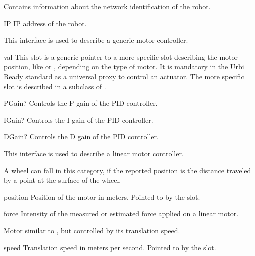 
Contains information about the network identification of the robot.

\begin{urbiscriptapi}
\item[IP] IP address of the robot.
\end{urbiscriptapi}


This interface is used to describe a generic motor controller.

\begin{urbiscriptapi}
\item[val] This slot is a generic pointer to a more specific slot describing
  the motor position, like  or , depending on the
  type of motor. It is mandatory in the Urbi Ready standard as a universal
  proxy to control an actuator. The more specific slot is described in a
  subclass of .
\item[PGain?] Controls the P gain of the PID controller.
\item[IGain?] Controls the I gain of the PID controller.
\item[DGain?] Controls the D gain of the PID controller.
\end{urbiscriptapi}



This interface is used to describe a linear motor controller.

A wheel can fall in this category, if the reported position is the distance
traveled by a point at the surface of the wheel.

\begin{urbiscriptapi}
\item[position] Position of the motor in meters.  Pointed to by the
   slot.

\item[force] Intensity of the measured or estimated force applied on a
  linear motor.
\end{urbiscriptapi}


Motor similar to , but controlled by its translation speed.

\begin{urbiscriptapi}
\item[speed] Translation speed in meters per second. Pointed to by the
   slot.
\end{urbiscriptapi}


